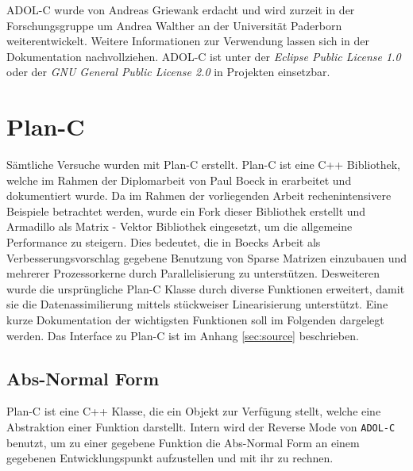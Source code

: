 ADOL-C wurde von Andreas Griewank erdacht und wird zurzeit in der Forschungsgruppe um Andrea Walther an der Universität Paderborn weiterentwickelt. Weitere Informationen zur Verwendung lassen sich in der Dokumentation \cite{walther2012getting} nachvollziehen. ADOL-C ist unter der \textit{Eclipse Public License 1.0} oder der \textit{GNU General Public License 2.0} in Projekten einsetzbar.

\section{Plan-C}
\label{sec:impl:planc}
Sämtliche Versuche wurden mit Plan-C erstellt. Plan-C ist eine C++ Bibliothek, welche im Rahmen der Diplomarbeit von Paul Boeck in \cite{boeck14} erarbeitet und dokumentiert wurde. Da im Rahmen der vorliegenden Arbeit rechenintensivere Beispiele betrachtet werden, wurde ein Fork dieser Bibliothek erstellt und Armadillo als Matrix - Vektor Bibliothek eingesetzt, um die allgemeine Performance zu steigern. Dies bedeutet, die in Boecks Arbeit als Verbesserungsvorschlag gegebene Benutzung von Sparse Matrizen einzubauen und mehrerer Prozessorkerne durch Parallelisierung zu unterstützen.  Desweiteren wurde die ursprüngliche Plan-C Klasse durch diverse Funktionen erweitert, damit sie die Datenassimilierung mittels stückweiser Linearisierung unterstützt. Eine kurze Dokumentation der wichtigsten Funktionen soll im Folgenden dargelegt werden. Das Interface zu Plan-C ist im Anhang \ref{sec:source} beschrieben.

\subsection{Abs-Normal Form}
Plan-C ist eine C++ Klasse, die ein Objekt zur Verfügung stellt, welche eine Abstraktion einer Funktion darstellt. Intern wird der Reverse Mode von \texttt{ADOL-C} benutzt, um zu einer gegebene Funktion die Abs-Normal Form an einem gegebenen Entwicklungspunkt aufzustellen und mit ihr zu rechnen.


